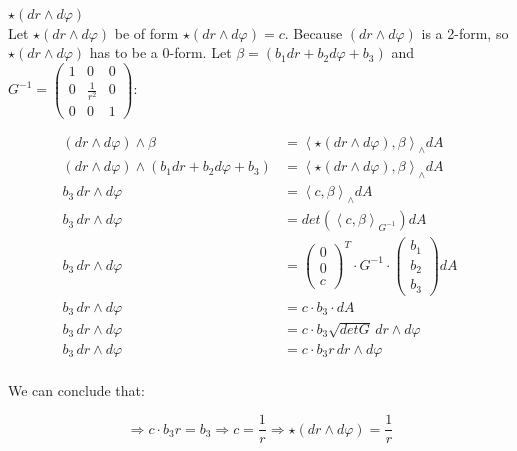 \documentclass{article}
\begin{document}
\newpage
\begin{center}
	$\boxed{\star (dr \wedge d\varphi)}$\\
	\vspace{1em}
	Let $\star (dr \wedge d\varphi)$ be of form $\star (dr \wedge d\varphi) = c$. Because $(dr \wedge d\varphi)$ is a 2-form, so $\star(dr \wedge d\varphi)$ has to be a 0-form. Let $\beta = (b_1dr + b_2 d\varphi + b_3)$ and
	$G^{-1} = \begin{pmatrix}
		1 & 0 & 0\\
		0 & \frac{1}{r^2} & 0\\
		0 & 0 & 1
		\end{pmatrix}$:
\end{center}
\begin{align*}
	(dr \wedge d\varphi) \wedge \beta &= \left\langle \star (dr \wedge d\varphi), \beta \right\rangle_\wedge dA\\
	(dr \wedge d\varphi) \wedge (b_1dr+b_2d\varphi + b_3) &= \left\langle \star (dr \wedge d\varphi), \beta \right\rangle_\wedge dA\\
	b_3\, dr \wedge d\varphi &= \left\langle c, \beta \right\rangle_\wedge dA\\
	b_3\, dr \wedge d\varphi &= det(\left\langle c, \beta \right\rangle_{G^{-1}}) dA\\
	b_3\, dr \wedge d\varphi &= \begin{pmatrix}
								0\\
								0\\
								c	
							  \end{pmatrix}^T\cdot G^{-1}\cdot \begin{pmatrix}
								b_1\\
								b_2\\
								b_3
								\end{pmatrix}dA\\
	b_3\, dr \wedge d\varphi &= c \cdot b_3 \cdot dA\\
	b_3\, dr \wedge d\varphi &= c \cdot b_3 \sqrt{det G} \, dr \wedge d\varphi\\
	b_3\, dr \wedge d\varphi &= c \cdot b_3 r\, dr \wedge d\varphi\\
\end{align*}
\begin{center}
	We can conclude that:
\end{center}
\begin{equation*}
	\Rightarrow c \cdot b_3 r = b_3 \Rightarrow c = \frac{1}{r} \Rightarrow \boxed{\star (dr \wedge d\varphi) = \frac{1}{r}}
\end{equation*}
\end{document}
